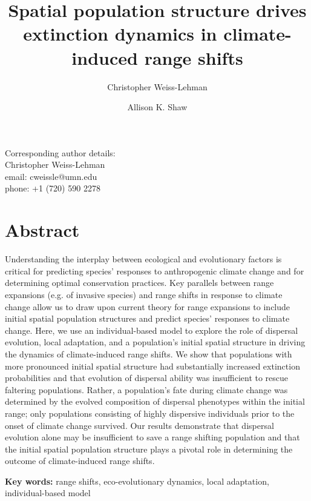 \documentclass[12pt, oneside]{article}
\title{Spatial population structure drives extinction dynamics in climate-induced range shifts}
\date{}
\author[1,*]{Christopher Weiss-Lehman}
\author[1]{Allison K. Shaw}
\affil[1]{Ecology, Evolution, and Behavior, University of Minnesota}
\affil[*]{Denotes corresponding author}
\begin{document}
\maketitle

\begin{flushleft}
Corresponding author details: \\
Christopher Weiss-Lehman \\
email: cweissle@umn.edu \\
phone: +1 (720) 590 2278 \\
\end{flushleft}

\doublespacing
\linenumbers

\newpage

\section*{Abstract}
Understanding the interplay between ecological and evolutionary factors is critical for predicting species' responses to anthropogenic climate change and for determining optimal conservation practices. Key parallels between range expansions (e.g. of invasive species) and range shifts in response to climate change allow us to draw upon current theory for range expansions to include initial spatial population structures and predict species' responses to climate change. Here, we use an individual-based model to explore the role of dispersal evolution, local adaptation, and a population's initial spatial structure in driving the dynamics of climate-induced range shifts. We show that populations with more pronounced initial spatial structure had substantially increased extinction probabilities and that evolution of dispersal ability was insufficient to rescue faltering populations. Rather, a population's fate during climate change was determined by the evolved composition of dispersal phenotypes within the initial range; only populations consisting of highly dispersive individuals prior to the onset of climate change survived. Our results demonstrate that dispersal evolution alone may be insufficient to save a range shifting population and that the initial spatial population structure plays a pivotal role in determining the outcome of climate-induced range shifts.

\begin{flushleft}
\textbf{Key words:} range shifts, eco-evolutionary dynamics, local adaptation, individual-based model
\end{flushleft}
\end{document}
